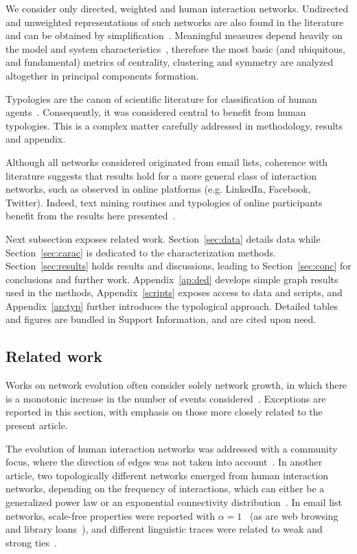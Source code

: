 \documentclass[%
 aip,
 jmp,%
 amsmath,amssymb,
 reprint,%
]{revtex4-1}
\begin{document}
We consider only directed, weighted and human interaction networks. Undirected and unweighted representations of such networks are also found in the literature and can be obtained by simplification~\cite{GMANE2}.
Meaningful measures depend heavily on the model and system characteristics~\cite{newmanStru, newmanWeight}, therefore the most basic (and ubiquitous, and fundamental) metrics of centrality, clustering and symmetry are analyzed altogether in principal components formation.

Typologies are the canon of scientific literature for classification of human agents~\cite{typCanon}. Consequently, it was considered central to benefit from human typologies. This is a complex matter carefully addressed in methodology, results and appendix.

Although all networks considered originated from email lists,
 coherence with literature suggests that results hold for a more general class of interaction networks,
 such as observed in online platforms (e.g. LinkedIn, Facebook, Twitter).
Indeed, text mining routines and typologies of online participants benefit from the results here presented~\cite{rcText,rcTipo}.

Next subsection exposes related work. Section~\ref{sec:data} details data while Section~\ref{sec:carac} is dedicated to the characterization methods. Section~\ref{sec:results} holds results and discussions, leading to Section~\ref{sec:conc} for conclusions and further work. Appendix~\ref{ap:ded} develops simple graph results used in the methods, Appendix~\ref{scripts} exposes access to data and scripts, and Appendix~\ref{ap:typ} further introduces the typological approach. Detailed tables and figures are bundled in Support Information, and are cited upon need.

\subsection{Related work}\label{sec:related}
Works on network evolution often consider solely network growth, in which there is a monotonic increase in the number of events considered~\cite{barabasiEvo}. Exceptions are reported in this section, with emphasis on those more closely related to the present article.

The evolution of human interaction networks was addressed with a community focus, where the direction of edges was not taken into account~\cite{barabasiEvo}. In another article, two topologically different networks emerged from human interaction networks, depending on the frequency of interactions, which can either be a generalized power law or an exponential connectivity distribution~\cite{barabasiTopologicalEv}. In email list networks, scale-free properties were reported with $\alpha=1$~\cite{bird} (as are web browsing and library loans~\cite{barabasiHumanDyn}), and different linguistic traces were related to weak and strong ties~\cite{GMANE2}.
\end{document}
